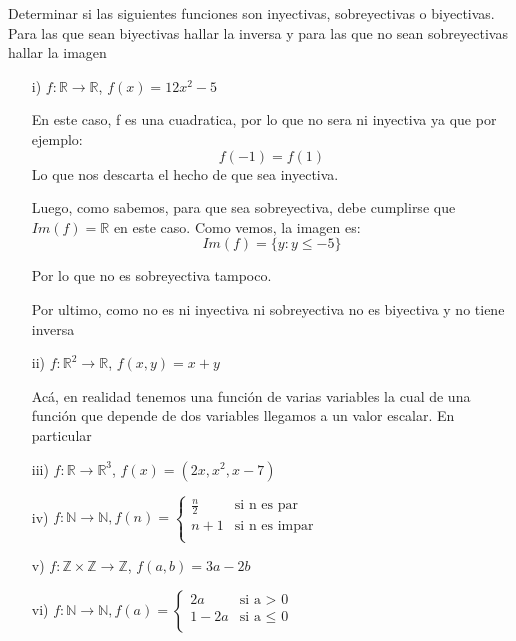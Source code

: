 \documentclass[10pt]{article}
\begin{document}
\begin{ej}
Determinar si las siguientes funciones son inyectivas, sobreyectivas o biyectivas. Para las que sean biyectivas hallar la inversa y para las que no sean sobreyectivas hallar la imagen
\begin{itemize}
	\item[i)] $f: \mathbb{R} \rightarrow \mathbb{R}$, $f(x) = 12 x^2 - 5$
		
		En este caso, f es una cuadratica, por lo que no sera ni inyectiva ya que por ejemplo:
		$$f(-1) = f(1)$$
		Lo que nos descarta el hecho de que sea inyectiva. 
		
		Luego, como sabemos, para que sea sobreyectiva, debe cumplirse que $Im(f) = \mathbb{R}$ en este caso. Como vemos, la imagen es: $$Im(f) = \{ y : y \leq -5 \}$$	
		
		Por lo que no es sobreyectiva tampoco.
		
		Por ultimo, como no es ni inyectiva ni sobreyectiva no es biyectiva y no tiene inversa
	\item[ii)] $f: \mathbb{R}^2 \rightarrow \mathbb{R}$, $f(x, y) = x + y$
	
	Acá, en realidad tenemos una función de varias variables la cual de una función que depende de dos variables llegamos a un valor escalar. En particular
	\item[iii)] $f: \mathbb{R} \rightarrow \mathbb{R}^3$, $f(x) = (2 x, x^2, x - 7)$
	\item[iv)] 		
			$f: \mathbb{N} \rightarrow \mathbb{N}, f(n)=\left\{\begin{array}{cc}
				 \frac{n}{2} & \mbox{si n es par} \\
						n + 1 & \mbox{si n es impar}  \\
			 \end{array}\right.$	
			
	\item[v)] $f: \mathbb{Z} \times \mathbb{Z} \rightarrow \mathbb{Z}$, $f(a, b) = 3a - 2b$
	\item[vi)] 
			$f: \mathbb{N} \rightarrow \mathbb{N}, f(a)=\left\{\begin{array}{cc}
				 2a & \mbox{si a $>$ 0} \\
				1 - 2a & \mbox{si a $\leq$ 0}  \\
			 \end{array}\right. $	
			
\end{itemize}
\end{ej}
\end{document}
